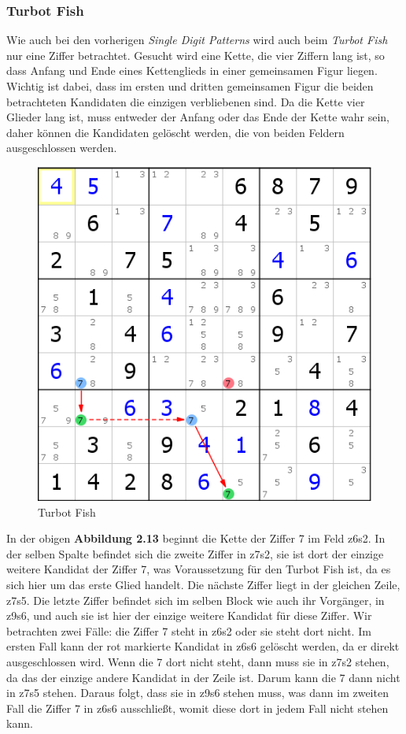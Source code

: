 \newpage
\subsubsection{Turbot Fish}
Wie auch bei den vorherigen \textit{Single Digit Patterns} wird auch beim \textit{Turbot Fish} nur eine Ziffer betrachtet. Gesucht wird eine Kette, die vier Ziffern lang ist, so dass Anfang und Ende eines Kettenglieds in einer gemeinsamen Figur liegen. Wichtig ist dabei, dass im ersten und dritten gemeinsamen Figur die beiden betrachteten Kandidaten die einzigen verbliebenen  sind. Da die Kette vier Glieder lang ist, muss entweder der Anfang oder das Ende der Kette wahr sein, daher können die Kandidaten gelöscht werden, die von beiden Feldern ausgeschlossen werden.

\begin{figure}[h]
\begin{center}
\includegraphics{./img/turbot_fish.png}
\caption{Turbot Fish}
\end{center}
\end{figure}

In der obigen \textbf{Abbildung 2.13} beginnt die Kette der Ziffer 7 im Feld z6s2. In der selben Spalte befindet sich die zweite Ziffer in z7s2, sie ist dort der einzige weitere Kandidat der Ziffer 7, was Voraussetzung für den Turbot Fish ist, da es sich hier um das erste Glied handelt. Die nächste Ziffer liegt in der gleichen Zeile, z7s5. Die letzte Ziffer befindet sich im selben Block wie auch ihr Vorgänger, in z9s6, und auch sie ist hier der einzige weitere Kandidat für diese Ziffer. Wir betrachten zwei Fälle: die Ziffer 7 steht in z6s2 oder sie steht dort nicht. Im ersten Fall kann der rot markierte Kandidat in z6s6 gelöscht werden, da er direkt ausgeschlossen wird. Wenn die 7 dort nicht steht, dann muss sie in z7s2 stehen, da das der einzige andere Kandidat in der Zeile ist. Darum kann die 7 dann nicht in z7s5 stehen. Daraus folgt, dass sie in z9s6 stehen muss, was dann im zweiten Fall die Ziffer 7 in z6s6 ausschließt, womit diese dort in jedem Fall nicht stehen kann.